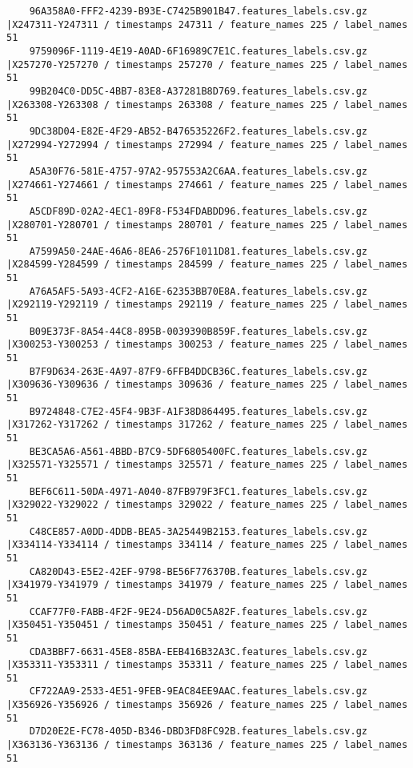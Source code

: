 \documentclass{UoNMCHA}
\numberwithin{equation}{section}
\begin{document}
\begin{lstlisting}
    96A358A0-FFF2-4239-B93E-C7425B901B47.features_labels.csv.gz |X247311-Y247311 / timestamps 247311 / feature_names 225 / label_names 51
    9759096F-1119-4E19-A0AD-6F16989C7E1C.features_labels.csv.gz |X257270-Y257270 / timestamps 257270 / feature_names 225 / label_names 51
    99B204C0-DD5C-4BB7-83E8-A37281B8D769.features_labels.csv.gz |X263308-Y263308 / timestamps 263308 / feature_names 225 / label_names 51
    9DC38D04-E82E-4F29-AB52-B476535226F2.features_labels.csv.gz |X272994-Y272994 / timestamps 272994 / feature_names 225 / label_names 51
    A5A30F76-581E-4757-97A2-957553A2C6AA.features_labels.csv.gz |X274661-Y274661 / timestamps 274661 / feature_names 225 / label_names 51
    A5CDF89D-02A2-4EC1-89F8-F534FDABDD96.features_labels.csv.gz |X280701-Y280701 / timestamps 280701 / feature_names 225 / label_names 51
    A7599A50-24AE-46A6-8EA6-2576F1011D81.features_labels.csv.gz |X284599-Y284599 / timestamps 284599 / feature_names 225 / label_names 51
    A76A5AF5-5A93-4CF2-A16E-62353BB70E8A.features_labels.csv.gz |X292119-Y292119 / timestamps 292119 / feature_names 225 / label_names 51
    B09E373F-8A54-44C8-895B-0039390B859F.features_labels.csv.gz |X300253-Y300253 / timestamps 300253 / feature_names 225 / label_names 51
    B7F9D634-263E-4A97-87F9-6FFB4DDCB36C.features_labels.csv.gz |X309636-Y309636 / timestamps 309636 / feature_names 225 / label_names 51
    B9724848-C7E2-45F4-9B3F-A1F38D864495.features_labels.csv.gz |X317262-Y317262 / timestamps 317262 / feature_names 225 / label_names 51
    BE3CA5A6-A561-4BBD-B7C9-5DF6805400FC.features_labels.csv.gz |X325571-Y325571 / timestamps 325571 / feature_names 225 / label_names 51
    BEF6C611-50DA-4971-A040-87FB979F3FC1.features_labels.csv.gz |X329022-Y329022 / timestamps 329022 / feature_names 225 / label_names 51
    C48CE857-A0DD-4DDB-BEA5-3A25449B2153.features_labels.csv.gz |X334114-Y334114 / timestamps 334114 / feature_names 225 / label_names 51
    CA820D43-E5E2-42EF-9798-BE56F776370B.features_labels.csv.gz |X341979-Y341979 / timestamps 341979 / feature_names 225 / label_names 51
    CCAF77F0-FABB-4F2F-9E24-D56AD0C5A82F.features_labels.csv.gz |X350451-Y350451 / timestamps 350451 / feature_names 225 / label_names 51
    CDA3BBF7-6631-45E8-85BA-EEB416B32A3C.features_labels.csv.gz |X353311-Y353311 / timestamps 353311 / feature_names 225 / label_names 51
    CF722AA9-2533-4E51-9FEB-9EAC84EE9AAC.features_labels.csv.gz |X356926-Y356926 / timestamps 356926 / feature_names 225 / label_names 51
    D7D20E2E-FC78-405D-B346-DBD3FD8FC92B.features_labels.csv.gz |X363136-Y363136 / timestamps 363136 / feature_names 225 / label_names 51

\end{lstlisting}
\end{document}
